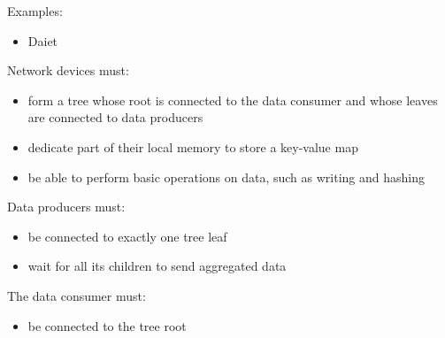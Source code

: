 Examples:
\begin{itemize}
    \item Daiet \cite{daiet}
\end{itemize}
Network devices must:
\begin{itemize}
    \item form a tree whose root is connected to the data consumer and whose leaves are connected to data producers
    \item dedicate part of their local memory to store a key-value map
    \item be able to perform basic operations on data, such as writing and hashing
\end{itemize}
Data producers must:
\begin{itemize}
    \item be connected to exactly one tree leaf
    \item wait for all its children to send aggregated data
\end{itemize}
The data consumer must:
\begin{itemize}
    \item be connected to the tree root
\end{itemize}